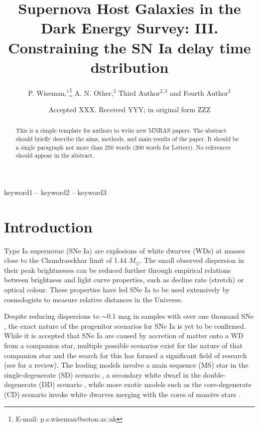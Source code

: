 \documentclass[fleqn,usenatbib]{mnras}
\title[Rates of SNe Ia in DES]{Supernova Host Galaxies in the Dark Energy Survey: III. Constraining the SN Ia delay time dstribution}
\author[P. Wiseman et al.]{
P. Wiseman,$^{1}$\thanks{E-mail: p.s.wiseman@soton.ac.uk}
A. N. Other,$^{2}$
Third Author$^{2,3}$
and Fourth Author$^{3}$
\\
}
\date{Accepted XXX. Received YYY; in original form ZZZ}
\begin{document}
\label{firstpage}
\pagerange{\pageref{firstpage}--\pageref{lastpage}}
\maketitle

\begin{abstract}
This is a simple template for authors to write new MNRAS papers.
The abstract should briefly describe the aims, methods, and main results of the paper.
It should be a single paragraph not more than 250 words (200 words for Letters).
No references should appear in the abstract.
\end{abstract}

\begin{keywords}
keyword1 -- keyword2 -- keyword3
\end{keywords}



\section{Introduction}

Type Ia supernovae (SNe Ia) are explosions of white dwarves (WDs) at masses close to the Chandrasekhar limit of 1.44 $M_{\odot}$. The small observed dispersion in their peak brightnesses can be reduced further through empirical relations between brightness and light curve properties, such as decline rate (stretch) or optical colour. These properties have led SNe Ia to be used extensively by cosmologists to measure relative distances in the Universe.

Despite reducing dispersions to $\sim 0.1$ mag in samples with over one thousand SNe \citep{Scolnic2018}, the exact nature of the progenitor scenarios for SNe Ia is yet to be confirmed. While it is accepted that SNe Ia are caused by accretion of matter onto a WD from a companion star, multiple possible scenarios exist for the nature of that companion star and the search for this has formed a significant field of research (see \citealt{Maoz2014} for a review). The leading models involve a main sequence (MS) star in the single-degenerate (SD) scenario \citep{Whelan1973,Nomoto1982}, a secondary white dwarf in the double-degenerate (DD) scenario \citep{Tutukov1976,Iben1984,Webbink1984}, while more exotic models such as the core-degenerate (CD) scenario invoke white dwarves merging with the cores of massive stars \citep{Soker2019}. 
\end{document}
